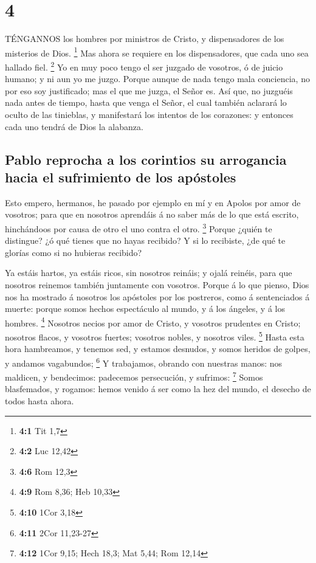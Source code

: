 \hypertarget{section-3}{%
\section{4}\label{section-3}}

 TÉNGANNOS los hombres por ministros de Cristo, y
dispensadores de los misterios de Dios. \footnote{\textbf{4:1} Tit 1,7}
 Mas ahora se requiere en los dispensadores, que cada uno
sea hallado fiel. \footnote{\textbf{4:2} Luc 12,42}  Yo en
muy poco tengo el ser juzgado de vosotros, ó de juicio humano; y ni aun
yo me juzgo.  Porque aunque de nada tengo mala conciencia,
no por eso soy justificado; mas el que me juzga, el Señor es.
 Así que, no juzguéis nada antes de tiempo, hasta que venga
el Señor, el cual también aclarará lo oculto de las tinieblas, y
manifestará los intentos de los corazones: y entonces cada uno tendrá de
Dios la alabanza.

\hypertarget{pablo-reprocha-a-los-corintios-su-arrogancia-hacia-el-sufrimiento-de-los-apuxf3stoles}{%
\subsection{Pablo reprocha a los corintios su arrogancia hacia el
sufrimiento de los
apóstoles}\label{pablo-reprocha-a-los-corintios-su-arrogancia-hacia-el-sufrimiento-de-los-apuxf3stoles}}

 Esto empero, hermanos, he pasado por ejemplo en mí y en
Apolos por amor de vosotros; para que en nosotros aprendáis á no saber
más de lo que está escrito, hinchándoos por causa de otro el uno contra
el otro. \footnote{\textbf{4:6} Rom 12,3}  Porque ¿quién te
distingue? ¿ó qué tienes que no hayas recibido? Y si lo recibiste, ¿de
qué te glorías como si no hubieras recibido?

 Ya estáis hartos, ya estáis ricos, sin nosotros reináis; y
ojalá reinéis, para que nosotros reinemos también juntamente con
vosotros.  Porque á lo que pienso, Dios nos ha mostrado á
nosotros los apóstoles por los postreros, como á sentenciados á muerte:
porque somos hechos espectáculo al mundo, y á los ángeles, y á los
hombres. \footnote{\textbf{4:9} Rom 8,36; Heb 10,33} 
Nosotros necios por amor de Cristo, y vosotros prudentes en Cristo;
nosotros flacos, y vosotros fuertes; vosotros nobles, y nosotros viles.
\footnote{\textbf{4:10} 1Cor 3,18}  Hasta esta hora
hambreamos, y tenemos sed, y estamos desnudos, y somos heridos de
golpes, y andamos vagabundos; \footnote{\textbf{4:11} 2Cor 11,23-27}
 Y trabajamos, obrando con nuestras manos: nos maldicen, y
bendecimos: padecemos persecución, y sufrimos: \footnote{\textbf{4:12}
  1Cor 9,15; Hech 18,3; Mat 5,44; Rom 12,14}  Somos
blasfemados, y rogamos: hemos venido á ser como la hez del mundo, el
desecho de todos hasta ahora.

